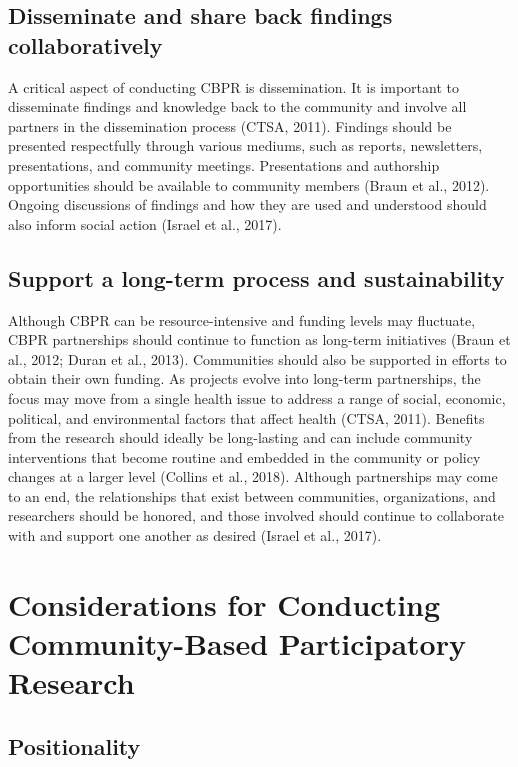 \documentclass[
  11pt,
]{book}
\begin{document}
\subsection{Disseminate and share back findings collaboratively}\label{disseminate-and-share-back-findings-collaboratively}

A critical aspect of conducting CBPR is dissemination. It is important to disseminate findings and knowledge back to the community and involve all partners in the dissemination process (CTSA, 2011). Findings should be presented respectfully through various mediums, such as reports, newsletters, presentations, and community meetings. Presentations and authorship opportunities should be available to community members (Braun et al., 2012). Ongoing discussions of findings and how they are used and understood should also inform social action (Israel et al., 2017).

\subsection{Support a long-term process and sustainability}\label{support-a-long-term-process-and-sustainability}

Although CBPR can be resource-intensive and funding levels may fluctuate, CBPR partnerships should continue to function as long-term initiatives (Braun et al., 2012; Duran et al., 2013). Communities should also be supported in efforts to obtain their own funding. As projects evolve into long-term partnerships, the focus may move from a single health issue to address a range of social, economic, political, and environmental factors that affect health (CTSA, 2011). Benefits from the research should ideally be long-lasting and can include community interventions that become routine and embedded in the community or policy changes at a larger level (Collins et al., 2018). Although partnerships may come to an end, the relationships that exist between communities, organizations, and researchers should be honored, and those involved should continue to collaborate with and support one another as desired (Israel et al., 2017).

\section{Considerations for Conducting Community-Based Participatory Research}\label{considerations-for-conducting-community-based-participatory-research}

\subsection{Positionality}\label{positionality}
\end{document}
